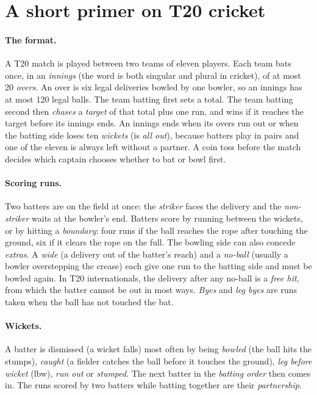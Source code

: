 \documentclass{article}
\newcommand{\1}{\mathbf{1}}
\begin{document}
\appendix
\section{A short primer on T20 cricket}\label{app:primer}

\paragraph{The format.} A T20 match is played between two teams of eleven players. Each team bats once, in an \emph{innings} (the word is both singular and plural in cricket), of at most 20 \emph{overs}. An over is six legal deliveries bowled by one bowler, so an innings has at most 120 legal balls. The team batting first sets a total. The team batting second then \emph{chases} a \emph{target} of that total plus one run, and wins if it reaches the target before its innings ends. An innings ends when its overs run out or when the batting side loses ten \emph{wickets} (is \emph{all out}), because batters play in pairs and one of the eleven is always left without a partner. A coin toss before the match decides which captain chooses whether to bat or bowl first.

\paragraph{Scoring runs.} Two batters are on the field at once: the \emph{striker} faces the delivery and the \emph{non-striker} waits at the bowler's end. Batters score by running between the wickets, or by hitting a \emph{boundary}: four runs if the ball reaches the rope after touching the ground, six if it clears the rope on the full. The bowling side can also concede \emph{extras}. A \emph{wide} (a delivery out of the batter's reach) and a \emph{no-ball} (usually a bowler overstepping the crease) each give one run to the batting side and must be bowled again. In T20 internationals, the delivery after any no-ball is a \emph{free hit}, from which the batter cannot be out in most ways. \emph{Byes} and \emph{leg byes} are runs taken when the ball has not touched the bat.

\paragraph{Wickets.} A batter is dismissed (a wicket falls) most often by being \emph{bowled} (the ball hits the stumps), \emph{caught} (a fielder catches the ball before it touches the ground), \emph{leg before wicket} (lbw), \emph{run out} or \emph{stumped}. The next batter in the \emph{batting order} then comes in. The runs scored by two batters while batting together are their \emph{partnership}.
\end{document}
